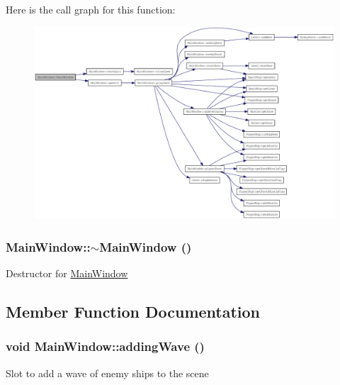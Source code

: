 Here is the call graph for this function:\nopagebreak
\begin{figure}[H]
\begin{center}
\leavevmode
\includegraphics[width=420pt]{class_main_window_a8b244be8b7b7db1b08de2a2acb9409db_cgraph}
\end{center}
\end{figure}
\hypertarget{class_main_window_ae98d00a93bc118200eeef9f9bba1dba7}{
\subsubsection[{$\sim$MainWindow}]{\setlength{\rightskip}{0pt plus 5cm}MainWindow::$\sim$MainWindow ()}}
\label{class_main_window_ae98d00a93bc118200eeef9f9bba1dba7}
Destructor for \hyperlink{class_main_window}{MainWindow} 

\subsection{Member Function Documentation}
\hypertarget{class_main_window_aa5e6f6d450a8cca11ebe714ac36146b0}{
\subsubsection[{addingWave}]{\setlength{\rightskip}{0pt plus 5cm}void MainWindow::addingWave ()}}
\label{class_main_window_aa5e6f6d450a8cca11ebe714ac36146b0}
Slot to add a wave of enemy ships to the scene

